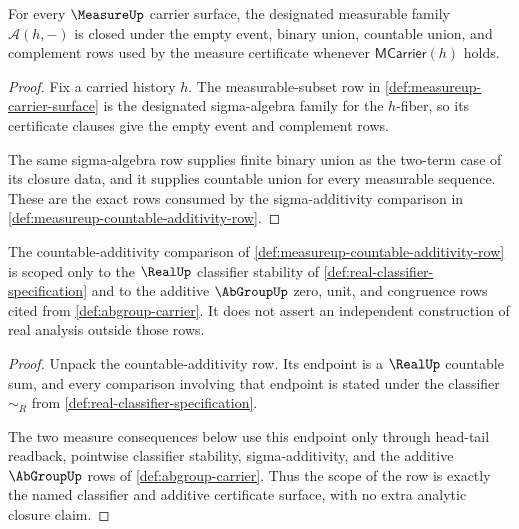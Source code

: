 \begin{theorem}
\label{thm:measure-sigma-algebra-obligations}
For every $\MeasureUp$ carrier surface, the designated measurable family
$\mathcal{A}(h,-)$ is closed under the empty event, binary union, countable
union, and complement rows used by the measure certificate whenever
$\mathsf{MCarrier}(h)$ holds.
\end{theorem}
\begin{proof}
Fix a carried history $h$. The measurable-subset row in
\autoref{def:measureup-carrier-surface} is the designated sigma-algebra family
for the $h$-fiber, so its certificate clauses give the empty event and
complement rows.

The same sigma-algebra row supplies finite binary union as the two-term case of
its closure data, and it supplies countable union for every measurable sequence.
These are the exact rows consumed by the sigma-additivity comparison in
\autoref{def:measureup-countable-additivity-row}.
\end{proof}

\begin{theorem}
\label{thm:measure-realup-sum-scope}
The countable-additivity comparison of
\autoref{def:measureup-countable-additivity-row} is scoped only to the
$\RealUp$ classifier stability of \autoref{def:real-classifier-specification}
and to the additive $\AbGroupUp$ zero, unit, and congruence rows cited from
\autoref{def:abgroup-carrier}. It does not assert an independent construction
of real analysis outside those rows.
\end{theorem}
\begin{proof}
Unpack the countable-additivity row. Its endpoint is a $\RealUp$ countable sum,
and every comparison involving that endpoint is stated under the classifier
$\sim_R$ from \autoref{def:real-classifier-specification}.

The two measure consequences below use this endpoint only through head-tail
readback, pointwise classifier stability, sigma-additivity, and the additive
$\AbGroupUp$ rows of \autoref{def:abgroup-carrier}. Thus the scope of the row is
exactly the named classifier and additive certificate surface, with no extra
analytic closure claim.
\end{proof}

